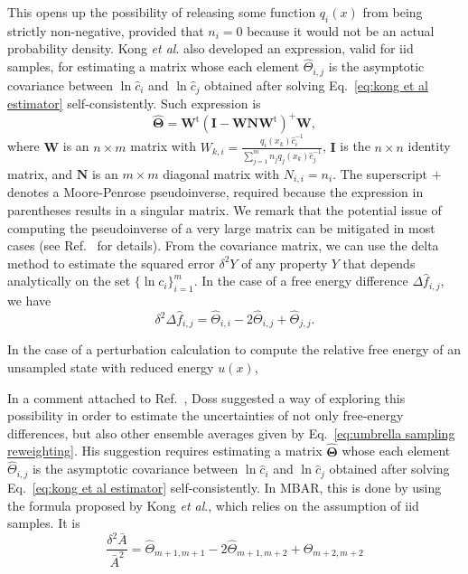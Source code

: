 \documentclass[aip,jcp,reprint,amsmath,amssymb]{revtex4-1}
\newcommand{\mt}[1]{\boldsymbol{\mathbf{#1}}}           %
\newcommand{\tr}[1]{#1^\text{t}}                        %
\begin{document}
This opens up the possibility of releasing some function $q_i(x)$ from being strictly non-negative, provided that $n_i = 0$ because it would not be an actual probability density. Kong \textit{et al}.\cite{Kong_2003} also developed an expression, valid for iid samples, for estimating a matrix whose each element $\hat \Theta_{i,j}$ is the asymptotic covariance between $\ln \hat c_i$ and $\ln \hat c_j$ obtained after solving Eq.~\eqref{eq:kong et al estimator} self-consistently. Such expression is
\begin{equation}
\label{eq:mbar covariance matrix}
\hat{\mt \Theta} = \tr{\mt W}(\mt I - {\mt W}{\mt N}\tr{\mt W})^+{\mt W},
\end{equation}
where $\mt W$ is an $n \times m$ matrix with $W_{k,i} = \frac{q_i(x_k) \hat c_i^{-1}}{\sum_{j=1}^m n_j q_j(x_k) \hat c_j^{-1}}$, $\mt I$ is the $n \times n$ identity matrix, and $\mt N$ is an $m \times m$ diagonal matrix with $N_{i,i} = n_i$. The superscript $+$ denotes a Moore-Penrose pseudoinverse, required because the expression in parentheses results in a singular matrix. We remark that the potential issue of computing the pseudoinverse of a very large matrix can be mitigated in most cases (see Ref.~ for details). From the covariance matrix, we can use the delta method\cite{Greene_2012} to estimate the squared error $\delta^2 Y$ of any property $Y$ that depends analytically on the set $\{\ln c_i\}_{i=1}^m$. In the case of a free energy difference $\Delta \hat f_{i,j}$, we have
\begin{equation}
\label{eq:mbar free mean-square error}
\delta^2 \Delta {\hat f_{i,j}} = {\hat \Theta}_{i,i} - 2 {\hat \Theta}_{i,j} + {\hat \Theta}_{j,j}.
\end{equation}

In the case of a perturbation calculation to compute the relative free energy of an unsampled state with reduced energy $u(x)$, 

In a comment attached to Ref.~, Doss suggested a way of exploring this possibility in order to estimate the uncertainties of not only free-energy differences, but also other ensemble averages given by Eq.~\eqref{eq:umbrella sampling reweighting}. His suggestion requires estimating a matrix $\hat {\mt \Theta}$ whose each element $\hat \Theta_{i,j}$ is the asymptotic covariance between $\ln \hat c_i$ and $\ln \hat c_j$ obtained after solving Eq.~\eqref{eq:kong et al estimator} self-consistently. In MBAR, this is done by using the formula proposed by Kong \textit{et al}.,\cite{Kong_2003} which relies on the assumption of iid samples. It is
\begin{equation*}
\frac{\delta^2 \bar A}{\bar A^2} = {\hat \Theta}_{m+1,m+1} - 2 {\hat \Theta}_{m+1,m+2} + {\hat \Theta}_{m+2,m+2}
\end{equation*}
\end{document}
